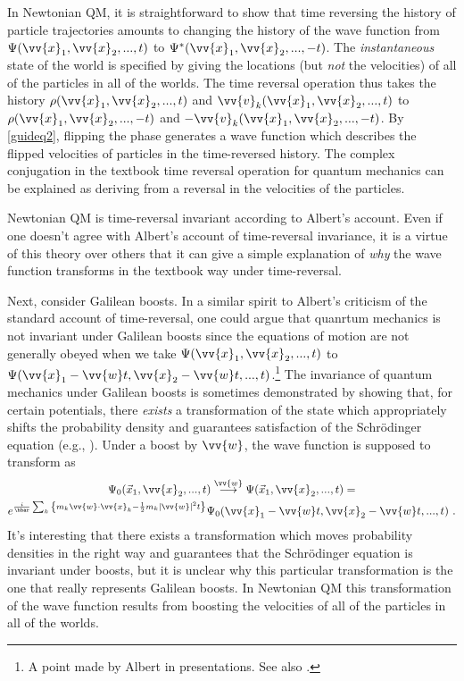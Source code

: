 \documentclass[12pt,secnumarabic,balancelastpage,amsmath,amssymb,nofootinbib]{article}
\begin{document}
In Newtonian QM, it is straightforward to show that time reversing the history of particle trajectories amounts to changing the history of the wave function from $\Psi(\vv{x}_1,\vv{x}_2,...,t)$ to $\Psi^*(\vv{x}_1,\vv{x}_2,...,-t)$.  The \emph{instantaneous} state of the world is specified by giving the locations (but \emph{not} the velocities) of all of the particles in all of the worlds.  The time reversal operation thus takes the history $\rho(\vv{x}_1,\vv{x}_2,...,t)$ and $\vv{v}_k(\vv{x}_1,\vv{x}_2,...,t)$ to $\rho(\vv{x}_1,\vv{x}_2,...,-t)$ and $-\vv{v}_k(\vv{x}_1,\vv{x}_2,...,-t)$.  By \eqref{guideq2}, flipping the phase generates a wave function which describes the flipped velocities of particles in the time-reversed history.  The complex conjugation in the textbook time reversal operation for quantum mechanics can be explained as deriving from a reversal in the velocities of the particles.

Newtonian QM is time-reversal invariant according to Albert's account.  Even if one doesn't agree with Albert's account of time-reversal invariance, it is a virtue of this theory over others that it can give a simple explanation of \emph{why} the wave function transforms in the textbook way under time-reversal.

Next, consider Galilean boosts.  In a similar spirit to Albert's criticism of the standard account of time-reversal, one could argue that quanrtum mechanics is not invariant under Galilean boosts since the equations of motion are not generally obeyed when we take $\Psi(\vv{x}_1,\vv{x}_2,...,t)$ to $\Psi(\vv{x}_1-\vv{w}t,\vv{x}_2-\vv{w}t,...,t)$.\footnote{A point made by Albert in presentations.  See also \citet{valentini1997}.}  The invariance of quantum mechanics under Galilean boosts is sometimes demonstrated by showing that, for certain potentials, there \emph{exists} a transformation of the state which appropriately shifts the probability density and guarantees satisfaction of the Schr\"{o}dinger equation (e.g., \citealp[]{ballentine}).  Under a boost by $\vv{w}$, the wave function is supposed to transform as
\begin{multline}
\Psi_0(\vec{x}_1,\vv{x}_2,...,t)\stackrel{\vv{w}}{\longrightarrow}\Psi(\vec{x}_1,\vv{x}_2,...,t)= \\
e^{\frac{i}{\hbar}\sum_k{\left\{m_k \vv{w}\cdot\vv{x}_k-\frac{1}{2}m_k |\vv{w}|^2 t\right\}}}
\Psi_0(\vv{x}_1-\vv{w}t,\vv{x}_2-\vv{w}t,...,t)\ .
\label{transf}
\end{multline}
It's interesting that there exists a transformation which moves probability densities in the right way and guarantees that the Schr\"{o}dinger equation is invariant under boosts, but it is unclear why this particular transformation is the one that really represents Galilean boosts.  In Newtonian QM this transformation of the wave function results from boosting the velocities of all of the particles in all of the worlds.
\end{document}
